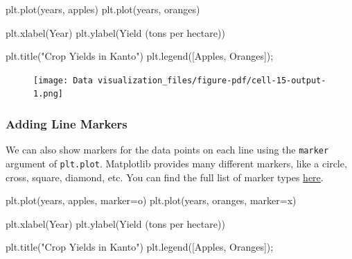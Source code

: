 \documentclass[
  letterpaper,
  DIV=11,
  numbers=noendperiod]{scrreprt}
\newenvironment{Shaded}{\begin{snugshade}}{\end{snugshade}}
\newcommand{\NormalTok}[1]{\textcolor[rgb]{0.00,0.23,0.31}{#1}}
\newcommand{\OperatorTok}[1]{\textcolor[rgb]{0.37,0.37,0.37}{#1}}
\newcommand{\StringTok}[1]{\textcolor[rgb]{0.13,0.47,0.30}{#1}}
\begin{document}
\begin{Shaded}
\begin{Highlighting}[]
\NormalTok{plt.plot(years, apples)}
\NormalTok{plt.plot(years, oranges)}

\NormalTok{plt.xlabel(}\StringTok{\textquotesingle{}Year\textquotesingle{}}\NormalTok{)}
\NormalTok{plt.ylabel(}\StringTok{\textquotesingle{}Yield (tons per hectare)\textquotesingle{}}\NormalTok{)}

\NormalTok{plt.title(}\StringTok{"Crop Yields in Kanto"}\NormalTok{)}
\NormalTok{plt.legend([}\StringTok{\textquotesingle{}Apples\textquotesingle{}}\NormalTok{, }\StringTok{\textquotesingle{}Oranges\textquotesingle{}}\NormalTok{])}\OperatorTok{;}
\end{Highlighting}
\end{Shaded}

\begin{figure}[H]

{\centering \texttt{[image: Data visualization\_files/figure-pdf/cell-15-output-1.png]}

}

\end{figure}

\hypertarget{adding-line-markers}{%
\subsubsection{Adding Line Markers}\label{adding-line-markers}}

We can also show markers for the data points on each line using the
\texttt{marker} argument of \texttt{plt.plot}. Matplotlib provides many
different markers, like a circle, cross, square, diamond, etc. You can
find the full list of marker types
\href{https://matplotlib.org/3.1.1/api/markers_api.html}{here}.

\begin{Shaded}
\begin{Highlighting}[]
\NormalTok{plt.plot(years, apples, marker}\OperatorTok{=}\StringTok{\textquotesingle{}o\textquotesingle{}}\NormalTok{)}
\NormalTok{plt.plot(years, oranges, marker}\OperatorTok{=}\StringTok{\textquotesingle{}x\textquotesingle{}}\NormalTok{)}

\NormalTok{plt.xlabel(}\StringTok{\textquotesingle{}Year\textquotesingle{}}\NormalTok{)}
\NormalTok{plt.ylabel(}\StringTok{\textquotesingle{}Yield (tons per hectare)\textquotesingle{}}\NormalTok{)}

\NormalTok{plt.title(}\StringTok{"Crop Yields in Kanto"}\NormalTok{)}
\NormalTok{plt.legend([}\StringTok{\textquotesingle{}Apples\textquotesingle{}}\NormalTok{, }\StringTok{\textquotesingle{}Oranges\textquotesingle{}}\NormalTok{])}\OperatorTok{;}
\end{Highlighting}
\end{Shaded}
\end{document}
